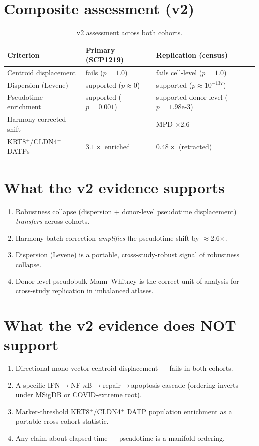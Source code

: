 \documentclass[11pt]{article}
\begin{document}
\section{Composite assessment (v2)}

\begin{table}[H]
\centering
\small
\begin{tabular}{lll}
\toprule
Criterion & Primary (SCP1219) & Replication (census) \\
\midrule
Centroid displacement & fails ($p=1.0$) & fails cell-level ($p=1.0$) \\
Dispersion (Levene) & supported ($p\approx 0$) & supported ($p\approx10^{-137}$) \\
Pseudotime enrichment & supported ($p=0.001$) & supported donor-level ($p=1.98\text{e-}3$) \\
Harmony-corrected shift & --- & MPD $\times 2.6$ \\
KRT8$^+$/CLDN4$^+$ DATPs & $3.1\times$ enriched & $0.48\times$ (retracted) \\
\bottomrule
\end{tabular}
\caption{v2 assessment across both cohorts.}
\end{table}

\section{What the v2 evidence supports}

\begin{enumerate}
\item Robustness collapse (dispersion + donor-level pseudotime displacement)
      \emph{transfers} across cohorts.
\item Harmony batch correction \emph{amplifies} the pseudotime shift by $\approx$2.6$\times$.
\item Dispersion (Levene) is a portable, cross-study-robust signal of
      robustness collapse.
\item Donor-level pseudobulk Mann--Whitney is the correct unit of analysis for
      cross-study replication in imbalanced atlases.
\end{enumerate}

\section{What the v2 evidence does NOT support}

\begin{enumerate}
\item Directional mono-vector centroid displacement --- fails in both cohorts.
\item A specific IFN$\to$NF-$\kappa$B$\to$repair$\to$apoptosis cascade
      (ordering inverts under MSigDB or COVID-extreme root).
\item Marker-threshold KRT8$^+$/CLDN4$^+$ DATP population enrichment as a portable
      cross-cohort statistic.
\item Any claim about elapsed time --- pseudotime is a manifold ordering.
\end{enumerate}
\end{document}
